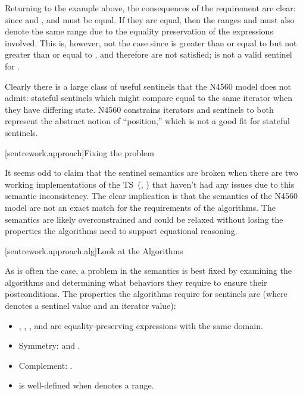 \pnum
Returning to the example above, the consequences of the
 requirement are clear: since 
and ,  and  must be equal. If
they are equal, then the ranges  and  must
also denote the same range due to the equality preservation of the expressions
involved. This is, however, not the case since  is greater
than or equal to  but not greater than or equal to .
 and therefore 
are not satisfied;  is not a valid sentinel for .

\pnum
Clearly there is a large class of useful sentinels that the N4560 model does
not admit: stateful sentinels which might compare equal to the same iterator
when they have differing state. N4560 constrains iterators and sentinels to
both represent the abstract notion of ``position,'' which is not a good fit
for stateful sentinels.

[sentrework.approach]{Fixing the problem}

\pnum
It seems odd to claim that the sentinel semantics are broken when there are two
working implementations of the TS~(\cite{range-v3}, \cite{cmcstl2}) that haven't
had any issues due to this semantic inconsistency. The clear implication is that
the semantics of the N4560 model are not an exact match for the requirements of
the algorithms. The semantics are likely overconstrained and could be relaxed
without losing the properties the algorithms need to support equational
reasoning.

[sentrework.approach.alg]{Look at the Algorithms}

\pnum
As is often the case, a problem in the semantics is best fixed by examining
the algorithms and determining what behaviors they require to ensure their
postconditions. The properties the algorithms require for sentinels are (where
 denotes a sentinel value and  an iterator value):
\begin{itemize}
\item {}, , , and  are
      equality-preserving expressions with the same domain.
\item Symmetry:  and
      .
\item Complement: .
\item {} is well-defined when  denotes a range.
\end{itemize}

